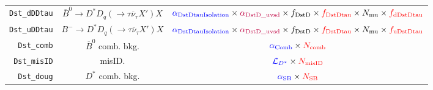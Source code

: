 \begin{landscape}
\begin{table}
\begin{tabular}{r|c|c}
  \texttt{Dst\_dDDtau} & $\overline{B}^0 \rightarrow D^* D_q (\rightarrow \tau \overline{\nu}_\tau X') X$  &                                                                             $\textcolor{blue}{\alpha_\text{DstDtauIsolation}} \times \textcolor{purple}{\alpha_\text{DstD\_uvsd}} \times f_\text{DstD} \times \textcolor{red}{f_\text{DstDtau}} \times N_\text{mu} \times \textcolor{red}{f_\text{dDstDtau}}$                                                                              \\
  \texttt{Dst\_uDDtau} &       $B^- \rightarrow D^* D_q (\rightarrow \tau \overline{\nu}_\tau X') X$       &                                                                             $\textcolor{blue}{\alpha_\text{DstDtauIsolation}} \times \textcolor{purple}{\alpha_\text{DstD\_uvsd}} \times f_\text{DstD} \times \textcolor{red}{f_\text{DstDtau}} \times N_\text{mu} \times \textcolor{red}{f_\text{uDstDtau}}$                                                                              \\
    \texttt{Dst\_comb} &                            $\overline{B}^0$ comb. bkg.                            &                                                                                                                                                        $\textcolor{blue}{\alpha_\text{Comb}} \times \textcolor{red}{N_\text{comb}}$                                                                                                                                                        \\
   \texttt{Dst\_misID} &                                      misID.                                       &                                                                                                                                                        $\textcolor{blue}{\mathcal{L}_{D^*}} \times \textcolor{red}{N_\text{misID}}$                                                                                                                                                        \\
    \texttt{Dst\_doug} &                                 $D^*$ comb. bkg.                                  &                                                                                                                                                          $\textcolor{blue}{\alpha_\text{SB}} \times \textcolor{red}{N_\text{SB}}$                                                                                                                                                          \\
\bottomrule
\end{tabular}

\end{table}
\end{landscape}
